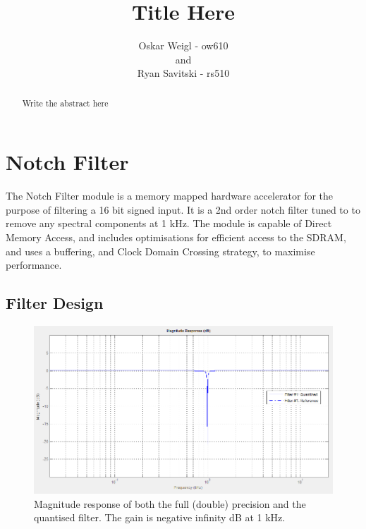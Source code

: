 \documentclass[]{article}
\title{Title Here}
\author{Oskar Weigl - ow610\\ and \\ Ryan Savitski - rs510}
\begin{document}
\maketitle

\begin{abstract}
	Write the abstract here
\end{abstract}

\tableofcontents
\clearpage


\section{Notch Filter} %
\label{sec:notch_filter}

The Notch Filter module is a memory mapped hardware accelerator for the purpose of filtering a 16 bit signed input. It is a 2nd order notch filter tuned to to remove any spectral components at 1 kHz.
The module is capable of Direct Memory Access, and includes optimisations for efficient access to the SDRAM, and uses a buffering, and Clock Domain Crossing strategy, to maximise performance.


\subsection{Filter Design} %
\label{sub:filter_design}

\begin{figure}[htbp]
	\begin{center}
		\includegraphics[width = \textwidth]{matlabmagnitudelog.PNG}
	\end{center}
	\caption{Magnitude response of both the full (double) precision and the quantised filter. The gain is negative infinity dB at 1 kHz.}
	\label{fig:matlabmagnitudelog}
\end{figure}
\end{document}
